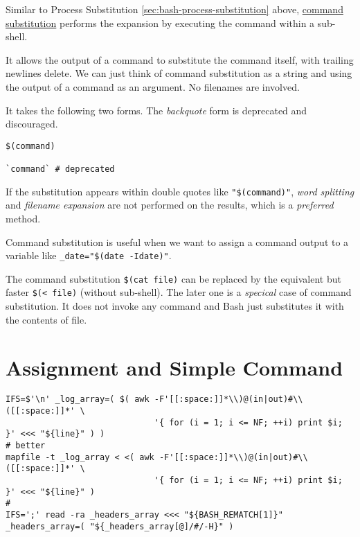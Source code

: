 Similar to Process Substitution
\ref{sec:bash-process-substitution} above,
\href{https://www.gnu.org/software/bash/manual/bash.html#Command-Substitution}{command
  substitution} performs the expansion by executing the command
within a sub-shell.

It allows the output of a command to substitute the command
itself, with trailing newlines delete. We can just think of
command substitution as a string and using the output of a command
as an argument. No filenames are involved.

It takes the following two
forms. The \textit{backquote} form is deprecated and discouraged.

\begin{lstlisting}
$(command)

`command` # deprecated
\end{lstlisting}

If the substitution appears within double quotes like
\lstinline|"$(command)"|, \textit{word splitting} and
\textit{filename expansion} are not performed on the results,
which is a \textit{preferred} method.

Command substitution is useful when we want to assign a command
output to a variable like \lstinline|_date="$(date -Idate)"|.

The command substitution \lstinline|$(cat file)| can be replaced
by the equivalent but faster
\lstinline|$(< file)| (without sub-shell). The later one is a
\textit{specical} case of command substitution. It does not invoke
any command and Bash just substitutes it with the contents of
file.

\section{Assignment and Simple Command}
\label{sec:assignm-simple-comm}

\begin{lstlisting}[basicstyle=\tiny\ttfamily]
IFS=$'\n' _log_array=( $( awk -F'[[:space:]]*\\)@(in|out)#\\([[:space:]]*' \
                              '{ for (i = 1; i <= NF; ++i) print $i; }' <<< "${line}" ) )
# better
mapfile -t _log_array < <( awk -F'[[:space:]]*\\)@(in|out)#\\([[:space:]]*' \
                              '{ for (i = 1; i <= NF; ++i) print $i; }' <<< "${line}" )
#
IFS=';' read -ra _headers_array <<< "${BASH_REMATCH[1]}"
_headers_array=( "${_headers_array[@]/#/-H}" )
\end{lstlisting}

